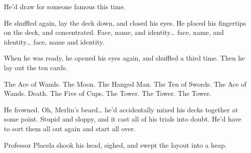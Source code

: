 He'd draw for someone famous this time.

He shuffled again, lay the deck down, and closed his eyes. He placed his
fingertips on the deck, and concentrated. Face, name, and
identity\ldots{} face, name, and identity\ldots{} face, name and
identity.

When he was ready, he opened his eyes again, and shuffled a third time.
Then he lay out the ten cards.

The Ace of Wands. The Moon. The Hanged Man. The Ten of Swords. The Ace
of Wands. Death. The Five of Cups. The Tower. The Tower. The Tower.

He frowned. Oh, Merlin's beard\ldots{} he'd accidentally mixed his decks
together at some point. Stupid and sloppy, and it cast all of his trials
into doubt. He'd have to sort them all out again and start all over.

Professor Placela shook his head, sighed, and swept the layout into a
heap.
